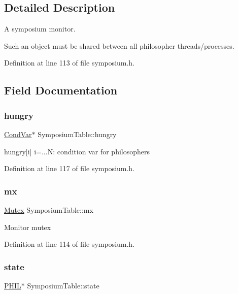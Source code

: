 \subsection{Detailed Description}
A symposium monitor. 

Such an object must be shared between all philosopher threads/processes. 

Definition at line 113 of file symposium.\+h.



\subsection{Field Documentation}
\mbox{\label{structSymposiumTable_a6daa1fdbfe8e836e72bfd6953bc91f6e}} 
\subsubsection{\texorpdfstring{hungry}{hungry}}
{\footnotesize\ttfamily \hyperlink{structCondVar}{Cond\+Var}$\ast$ Symposium\+Table\+::hungry}

hungry\mbox{[}i\mbox{]} i=...N\+: condition var for philosophers 

Definition at line 117 of file symposium.\+h.

\mbox{\label{structSymposiumTable_a8c36f26f523e6b2f99f6e70fff098de8}} 
\subsubsection{\texorpdfstring{mx}{mx}}
{\footnotesize\ttfamily \hyperlink{group__syscalls_gaef2ec62cae8e0031fd19fc8b91083ade}{Mutex} Symposium\+Table\+::mx}

Monitor mutex 

Definition at line 114 of file symposium.\+h.

\mbox{\label{structSymposiumTable_a70507f28df670d0db2e59fc65309af08}} 
\subsubsection{\texorpdfstring{state}{state}}
{\footnotesize\ttfamily \hyperlink{symposium_8h_a9fced5fb7d50a8fa2e8ae45b0cae3520}{P\+H\+IL}$\ast$ Symposium\+Table\+::state}


